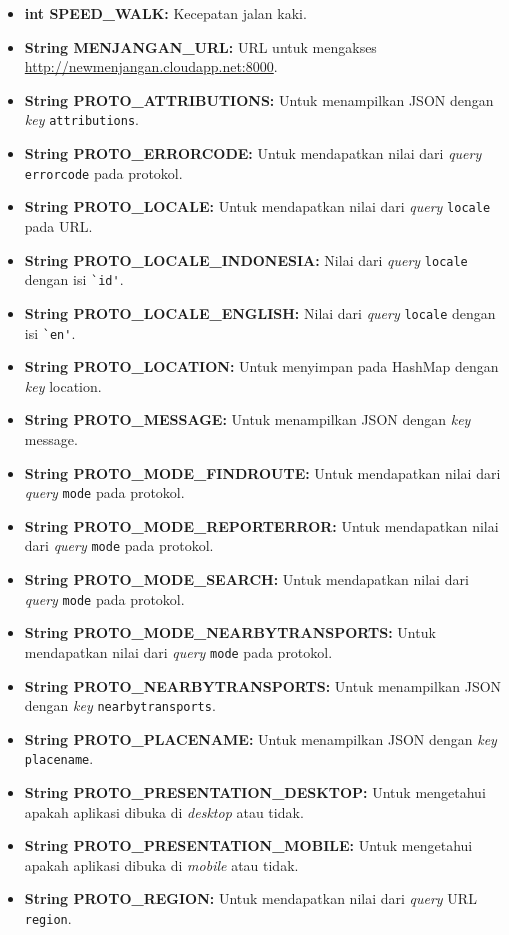 \begin{enumerate}
\begin{itemize}
		\item \textbf{int SPEED\_WALK:} Kecepatan jalan kaki.
		\item \textbf{String MENJANGAN\_URL:} URL untuk mengakses \url{http://newmenjangan.cloudapp.net:8000}.
		\item \textbf{String PROTO\_ATTRIBUTIONS:} Untuk menampilkan JSON dengan \textit{key} \verb!attributions!. 
		\item \textbf{String PROTO\_ERRORCODE:} Untuk mendapatkan nilai dari \textit{query} \verb!errorcode! pada protokol.
		\item \textbf{String PROTO\_LOCALE:} Untuk mendapatkan nilai dari \textit{query} \verb!locale! pada URL.
		\item \textbf{String PROTO\_LOCALE\_INDONESIA:} Nilai dari \textit{query} \verb!locale! dengan isi \verb!`id'!.
		\item \textbf{String PROTO\_LOCALE\_ENGLISH:} Nilai dari \textit{query} \verb!locale! dengan isi \verb!`en'!.
		\item \textbf{String PROTO\_LOCATION:} Untuk menyimpan pada HashMap dengan \textit{key} location.
		\item \textbf{String PROTO\_MESSAGE:} Untuk menampilkan JSON dengan \textit{key} message.
		\item \textbf{String PROTO\_MODE\_FINDROUTE:} Untuk mendapatkan nilai dari \textit{query}  \verb!mode! pada protokol.
		\item \textbf{String PROTO\_MODE\_REPORTERROR:} Untuk mendapatkan nilai dari \textit{query}  \verb!mode! pada protokol.
		\item \textbf{String PROTO\_MODE\_SEARCH:} Untuk mendapatkan nilai dari \textit{query}  \verb!mode! pada protokol.
		\item \textbf{String PROTO\_MODE\_NEARBYTRANSPORTS:} Untuk mendapatkan nilai dari \textit{query}  \verb!mode! pada protokol.
		\item \textbf{String PROTO\_NEARBYTRANSPORTS:} Untuk menampilkan JSON dengan \textit{key} \verb!nearbytransports!.
		\item \textbf{String PROTO\_PLACENAME:} Untuk menampilkan JSON dengan \textit{key} \verb!placename!.
		\item \textbf{String PROTO\_PRESENTATION\_DESKTOP:} Untuk mengetahui apakah aplikasi dibuka di \textit{desktop} atau tidak.
		\item \textbf{String PROTO\_PRESENTATION\_MOBILE:} Untuk mengetahui apakah aplikasi dibuka di \textit{mobile} atau tidak.
		\item \textbf{String PROTO\_REGION:} Untuk mendapatkan nilai dari \textit{query} URL \verb!region!.

\end{itemize}
\end{enumerate}
